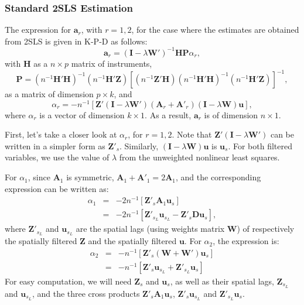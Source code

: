 \documentclass{article}
\begin{document}
\subsubsection{Standard 2SLS Estimation}\label{ss:weightsstandard}
The expression for $\mathbf{a}_r$, with $r = 1,2$, for the case where the estimates
are obtained from 2SLS is given in K-P-D as follows:
\begin{equation}\label{eq:arstandard}
\mathbf{a}_r = (\mathbf{I} - \lambda \mathbf{W'} )^{-1} \mathbf{HP} \alpha_r,
\end{equation}
with $\mathbf{H}$ as a $n \times p$ matrix of instruments, 
\begin{equation}\label{eq:Pstandard}
\mathbf{P} = (n^{-1}\mathbf{H'H})^{-1} ( n^{-1} \mathbf{H'Z} ) 
        [ (n^{-1} \mathbf{Z'H} ) (n^{-1} \mathbf{H'H} )^{-1} (n^{-1} \mathbf{H'Z}) ]^{-1},
\end{equation}
as a matrix of dimension $p \times k$, and
\begin{equation*}
\alpha_r = - n^{-1} [ \mathbf{Z'} (\mathbf{I} - \lambda \mathbf{W'}) (\mathbf{A}_r + \mathbf{A'}_r) 
 ( \mathbf{I} - \lambda \mathbf{W} ) \mathbf{u} ],
\end{equation*}
where $\alpha_r$ is a vector of dimension $k \times 1$. As a result, $\mathbf{a}_r$ is of
dimension $n \times 1$.

First, let's take a closer look at $\alpha_r$, for $r = 1,2$. Note that $\mathbf{Z'} (\mathbf{I} - \lambda \mathbf{W'})$ can be written in a simpler form as $\mathbf{Z'}_s$. Similarly, 
$ ( \mathbf{I} - \lambda \mathbf{W} ) \mathbf{u}$ is $\mathbf{u}_s$. For both filtered variables,
we use the value of $\lambda$ from the unweighted nonlinear least squares.

For $\alpha_1$, since $\mathbf{A}_1$ is symmetric, $\mathbf{A}_1 + \mathbf{A'}_1 = 2 \mathbf{A}_1$, and the corresponding expression can be written as:
\begin{eqnarray*}
\alpha_1 &=& - 2 n^{-1} [ \mathbf{Z'}_s \mathbf{A}_1 \mathbf{u}_s ]\\
    &=& -2 n^{-1} [ \mathbf{Z'}_{s_L} \mathbf{u}_{s_L} - \mathbf{Z'}_s \mathbf{D} \mathbf{u}_s ],
\end{eqnarray*}
where $\mathbf{Z'}_{s_L}$ and $\mathbf{u}_{s_L}$ are the spatial lags (using weights
matrix $\mathbf{W}$) of respectively the spatially filtered $\mathbf{Z}$ and the spatially
filtered $\mathbf{u}$. For $\alpha_2$, the expression is:
\begin{eqnarray*}
 \alpha_2 &=& - n^{-1} [ \mathbf{Z'}_s (\mathbf{W} + \mathbf{W'} ) \mathbf{u}_s ] \\
    &=& - n^{-1} [ \mathbf{Z'}_s \mathbf{u}_{s_L} + \mathbf{Z'}_{s_L} \mathbf{u}_s ]
\end{eqnarray*}
For easy computation, we will need $\mathbf{Z}_s$ and $\mathbf{u}_s$, as well as their
spatial lags, $\mathbf{Z}_{s_L}$ and $\mathbf{u}_{s_L}$, and the three cross products
$ \mathbf{Z'}_s \mathbf{A}_1 \mathbf{u}_s$, $\mathbf{Z'}_s \mathbf{u}_{s_L} $
and $\mathbf{Z'}_{s_L} \mathbf{u}_s$.
\end{document}
